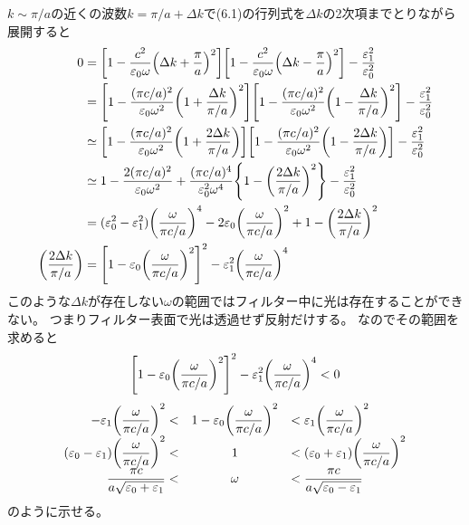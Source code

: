 \documentclass[../ap_2008.tex]{subfiles}
\begin{document}
\section{}
\(k\sim \pi/a\)の近くの波数\(k= \pi/a+\Delta k\)で(6.1)の行列式を\(\Delta k\)の2次項までとりながら展開すると
\begin{equation}\begin{aligned}[b]
    0&=\qty[1-\frac{c^2}{\varepsilon_0\omega}\qty(\Delta k+\frac{\pi}{a})^2]
    \qty[1-\frac{c^2}{\varepsilon_0\omega}\qty(\Delta k-\frac{\pi}{a})^2]
    -\frac{\varepsilon_1^2}{\varepsilon_0^2}\\
    &=\qty[1-\frac{(\pi c/a)^2}{\varepsilon_0\omega^2}\qty(1+\frac{\Delta k}{\pi/a})^2]
    \qty[1-\frac{(\pi c/a)^2}{\varepsilon_0\omega^2}\qty(1-\frac{\Delta k}{\pi/a})^2]
    -\frac{\varepsilon_1^2}{\varepsilon_0^2}\\
    &\simeq \qty[1-\frac{(\pi c/a)^2}{\varepsilon_0\omega^2}\qty(1+\frac{2\Delta k}{\pi/a})]
    \qty[1-\frac{(\pi c/a)^2}{\varepsilon_0\omega^2}\qty(1-\frac{2\Delta k}{\pi/a})]
    -\frac{\varepsilon_1^2}{\varepsilon_0^2}\\
    &\simeq 1-\frac{2(\pi c/a)^2}{\varepsilon_0 \omega^2}
    +\frac{(\pi c/a)^4}{\varepsilon_0^2\omega^4}\qty{1-\qty(\frac{2\Delta k}{\pi/a})^2}
    -\frac{\varepsilon_1^2}{\varepsilon_0^2}\\
    &=(\varepsilon_0^2-\varepsilon_1^2)\qty(\frac{\omega}{\pi c/a})^4-2\varepsilon_0\qty(\frac{\omega}{\pi c/a})^2
    +1-\qty(\frac{2\Delta k}{\pi/a})^2\\
    \qty(\frac{2\Delta k}{\pi/a})&= \qty[1-\varepsilon_0\qty(\frac{\omega}{\pi c/a})^2]^2 - \varepsilon_1^2\qty(\frac{\omega}{\pi c/a})^4
\end{aligned}\end{equation}
このような\(\Delta k\)が存在しない\(\omega\)の範囲ではフィルター中に光は存在することができない。
つまりフィルター表面で光は透過せず反射だけする。
なのでその範囲を求めると
\begin{equation*}
    \qty[1-\varepsilon_0\qty(\dfrac{\omega}{\pi c/a})^2]^2- \varepsilon_1^2\qty(\dfrac{\omega}{\pi c/a})^4<0
\end{equation*}
\begin{equation}
    \begin{array}{rcl}
    -\varepsilon_1\qty(\dfrac{\omega}{\pi c/a})^2<&1-\varepsilon_0\qty(\dfrac{\omega}{\pi c/a})^2& < \varepsilon_1\qty(\dfrac{\omega}{\pi c/a})^2\\
    (\varepsilon_0-\varepsilon_1)\qty(\dfrac{\omega}{\pi c/a})^2<&1& < (\varepsilon_0+\varepsilon_1)\qty(\dfrac{\omega}{\pi c/a})^2\\
    \dfrac{\pi c}{a\sqrt{\varepsilon_0+\varepsilon_1}}<& \omega &< \dfrac{\pi c}{a\sqrt{\varepsilon_0-\varepsilon_1}}
\end{array}\end{equation}
のように示せる。
\end{document}
